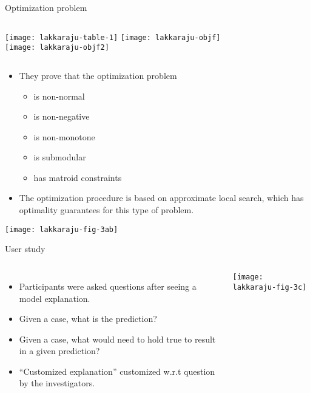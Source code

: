 \documentclass[aspectratio=169]{beamer}
\begin{document}
	\begin{frame}{Optimization problem}
		\begin{columns}
			\texttt{[image: lakkaraju-table-1]}
			\texttt{[image: lakkaraju-objf]} \\ \vspace{1cm}
			\texttt{[image: lakkaraju-objf2]}
		\end{columns}
	\end{frame}
	
	\begin{frame}
		\begin{itemize}
			\item They prove that the optimization problem
			\begin{itemize}
				\item is non-normal
				\item is non-negative
				\item is non-monotone
				\item is submodular
				\item has matroid constraints
			\end{itemize}
			\item The optimization procedure is based on approximate local search, which has optimality guarantees for this type of problem.
		\end{itemize}
	\end{frame}

	\begin{frame}
		\texttt{[image: lakkaraju-fig-3ab]}
	\end{frame}

	\begin{frame}{User study}
		\begin{columns}
			\column{0.5\linewidth}
			\begin{itemize}
				\item Participants were asked questions after seeing a model explanation.
				\item Given a case, what is the prediction?
				\item Given a case, what would need to hold true to result in a given prediction?
				\item ``Customized explanation'' customized w.r.t question by the investigators.
			\end{itemize}
			\column{0.45\linewidth}
			\texttt{[image: lakkaraju-fig-3c]}
		\end{columns}
		
	\end{frame}
\end{document}
